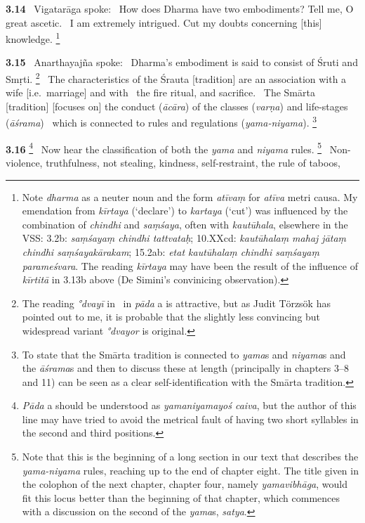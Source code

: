 \documentclass{article}
\newcommand{\skt}[1]{\textit{#1}}
\begin{document}
\textbf{3.14}%
\ Vigatarāga spoke:%
\ How does Dharma have two embodiments? Tell me, O great ascetic.%
\ I am extremely intrigued. Cut my doubts concerning [this] knowledge.%
\footnote{Note \skt{dharma} as a neuter noun and the form \skt{atīvaṃ} for \skt{atīva} metri causa.         My emendation from \skt{kīrtaya} (`declare') to \skt{kartaya} (`cut') was influenced by the combination        of \skt{chindhi} and \skt{saṃśaya}, often with \skt{kautūhala}, elsewhere in the VSS:                3.2b: \skt{saṃśayaṃ chindhi tattvataḥ};                 10.XXcd: \skt{kautūhalaṃ mahaj jātaṃ chindhi saṃśayakārakam};                15.2ab: \skt{etat kautūhalaṃ chindhi saṃśayaṃ parameśvara}.                 The reading \skt{kīrtaya} may have been the result of the influence of \skt{kīrtitā} in 3.13b above                        (De Simini's convinicing observation). }%


\textbf{3.15}%
\ Anarthayajña spoke:%
\ Dharma's embodiment is said to consist of Śruti and Smṛti.%
\footnote{The reading \skt{°dvayī} in \msNc\ in \skt{pāda} a is attractive, but as Judit                         Törzsök has pointed out to me, it is probable that                        the slightly less convincing but widespread variant \skt{°dvayor} is original. }%
\ The characteristics of the Śrauta [tradition] are an association with a wife [i.e.\ marriage] and with%
\                          the fire ritual, and sacrifice.%
\ The Smārta [tradition] [focuses on] the conduct (\skt{ācāra}) of the classes (\skt{varṇa}) and life-stages (\skt{āśrama})%
\                   which is connected to rules and regulations (\skt{yama-niyama}).%
\footnote{To state that the Smārta tradition is connected to \skt{yama}s and \skt{niyama}s and the \skt{āśrama}s and        then to discuss these at length (principally in chapters 3--8 and 11) can be seen                                 as a clear self-identification with the Smārta tradition. }%


\textbf{3.16}%
\footnote{\skt{Pāda} a should be understood as \skt{yamaniyamayoś caiva}, but the author of this line                may have tried to avoid the metrical fault of having two short syllables in the second and third positions. }%
\ Now hear the classification of both the \skt{yama} and \skt{niyama} rules.%
\footnote{Note that this is the beginning of a long section in our text        that describes the \skt{yama-niyama} rules, reaching up to the end of chapter eight.         The title given in the colophon of the next chapter, chapter four, namely \skt{yamavibhāga},        would fit this locus better than the beginning of that chapter, which         commences with a discussion on the second of the \skt{yama}s, \skt{satya}. }%
\ Non-violence, truthfulness, not stealing, kindness, self-restraint, the rule of taboos,%
\end{document}
